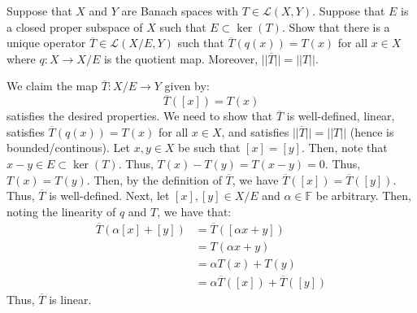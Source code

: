 \documentclass[12pt]{article}
\begin{document}
\begin{problem}{31}
    Suppose that $X$ and $Y$ are Banach spaces with $T \in \mathcal{L}(X, Y)$. Suppose that $E$ is a closed proper subspace of $X$ such that $E \subset \ker(T)$. Show that there is a unique operator $\overline{T} \in \mathcal{L}(X/E, Y)$ such that $\overline{T}(q(x)) = T(x)$ for all $x \in X$ where $q: X \to X/E$ is the quotient map. Moreover, $||\overline{T}|| = ||T||$.
\end{problem}
\begin{solution} 
    We claim the map $\overline{T}: X/E \to Y$ given by: 
    \[ \overline{T}([x]) = T(x)\]
    satisfies the desired properties. We need to show that $\overline{T}$ is well-defined, linear, satisfies $\overline{T}(q(x)) = T(x)$ for all $x \in X$, and satisfies $||\overline{T}|| = ||T||$ (hence is bounded/continous). \bbni
    Let $x, y \in X$ be such that $[x] = [y]$. Then, note that $x - y \in E \subset \ker(T)$. Thus, $T(x)-T(y) = T(x-y) = 0$. Thus, $T(x) = T(y)$. Then, by the definition of $\overline{T}$, we have $\overline{T}([x]) = \overline{T}([y])$. Thus, $\overline{T}$ is well-defined. \bbni
    Next, let $[x], [y] \in X/E$ and $\alpha \in \mathbb{F}$ be arbitrary. Then, noting the linearity of $q$ and $T$, we have that:
    \begin{align*}
        \overline{T}(\alpha[x] + [y]) &= \overline{T}([\alpha x + y]) \\
        &= T(\alpha x + y) \\
        &= \alpha T(x) + T(y) \\
        &= \alpha \overline{T}([x]) + \overline{T}([y])
    \end{align*}
    Thus, $\overline{T}$ is linear. \bbni
\end{solution}
\newpage 
\end{document}
